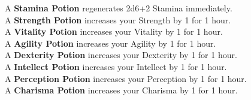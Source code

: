 A \textbf{Stamina Potion} regenerates 2d6+2 Stamina immediately.\\

A \textbf{Strength Potion} increases your Strength by 1 for 1 hour.\\

A \textbf{Vitality Potion} increases your Vitality by 1 for 1 hour.\\

A \textbf{Agility Potion} increases your Agility by 1 for 1 hour.\\

A \textbf{Dexterity Potion} increases your Dexterity by 1 for 1 hour.\\

A \textbf{Intellect Potion} increases your Intellect by 1 for 1 hour.\\

A \textbf{Perception Potion} increases your Perception by 1 for 1 hour.\\

A \textbf{Charisma Potion} increases your Charisma by 1 for 1 hour.